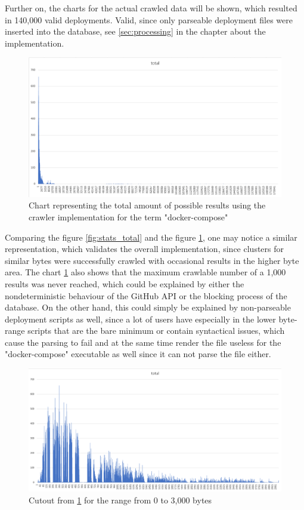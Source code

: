 Further on, the charts for the actual crawled data will be shown, which resulted in 140,000 valid deployments. Valid, since only parseable deployment files were inserted into the database, see \ref{sec:processing} in the chapter about the implementation.

\begin{figure}[H]
    \centering
    \includegraphics[scale=0.5]{graphics/deployment_stats_total.png}
    \caption{Chart representing the total amount of possible results using the crawler implementation for the term "docker-compose"}
    \label{fig:deployment_total}
\end{figure}

Comparing the figure \ref{fig:stats_total} and the figure \ref{fig:deployment_total}, one may notice a similar representation, which validates the overall implementation, since clusters for similar bytes were successfully crawled with occasional results in the higher byte area.
The chart \ref{fig:deployment_total} also shows that the maximum crawlable number of a 1,000 results was never reached, which could be explained by either the nondeterministic behaviour of the GitHub API or the blocking process of the database. On the other hand, this could simply be explained by non-parseable deployment scripts as well, since a lot of users have especially in the lower byte-range scripts that are the bare minimum or contain syntactical issues, which cause the parsing to fail and at the same time render the file useless for the "docker-compose" executable as well since it can not parse the file either.

\begin{figure}[H]
    \centering
    \includegraphics[scale=0.5]{graphics/deployment_stats_range.png}
    \caption{Cutout from \ref{fig:deployment_total} for the range from 0 to 3,000 bytes}
    \label{fig:deployment_range}
\end{figure}

